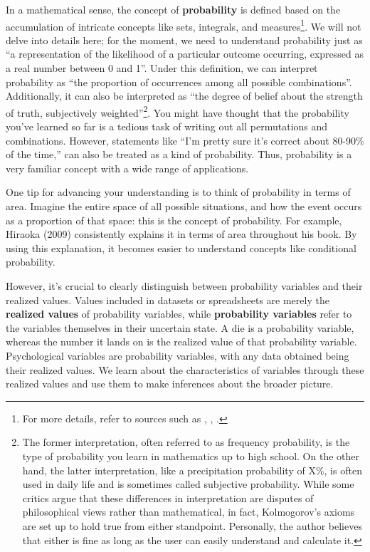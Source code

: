 \documentclass[
  a4paper,
]{book}
\begin{document}
In a mathematical sense, the concept of \textbf{probability} is defined
based on the accumulation of intricate concepts like sets, integrals,
and measures\footnote{For more details, refer to sources such as
  \textcite{Yoshida2021-02-25}, \textcite{Kono1999-05-01},
  \textcite{Sato1994-02-25}.}. We will not delve into details here; for
the moment, we need to understand probability just as ``a representation
of the likelihood of a particular outcome occurring, expressed as a real
number between 0 and 1''. Under this definition, we can interpret
probability as ``the proportion of occurrences among all possible
combinations''. Additionally, it can also be interpreted as ``the degree
of belief about the strength of truth, subjectively
weighted''\footnote{The former interpretation, often referred to as
  frequency probability, is the type of probability you learn in
  mathematics up to high school. On the other hand, the latter
  interpretation, like a precipitation probability of X\%, is often used
  in daily life and is sometimes called subjective probability. While
  some critics argue that these differences in interpretation are
  disputes of philosophical views rather than mathematical, in fact,
  Kolmogorov's axioms are set up to hold true from either standpoint.
  Personally, the author believes that either is fine as long as the
  user can easily understand and calculate it.}. You might have thought
that the probability you've learned so far is a tedious task of writing
out all permutations and combinations. However, statements like ``I'm
pretty sure it's correct about 80-90\% of the time,'' can also be
treated as a kind of probability. Thus, probability is a very familiar
concept with a wide range of applications.

One tip for advancing your understanding is to think of probability in
terms of area. Imagine the entire space of all possible situations, and
how the event occurs as a proportion of that space: this is the concept
of probability. For example, Hiraoka (2009) consistently explains it in
terms of area throughout his book. By using this explanation, it becomes
easier to understand concepts like conditional probability.

However, it's crucial to clearly distinguish between probability
variables and their realized values. Values included in datasets or
spreadsheets are merely the \textbf{realized values} of probability
variables, while \textbf{probability variables} refer to the variables
themselves in their uncertain state. A die is a probability variable,
whereas the number it lands on is the realized value of that probability
variable. Psychological variables are probability variables, with any
data obtained being their realized values. We learn about the
characteristics of variables through these realized values and use them
to make inferences about the broader picture.
\end{document}
